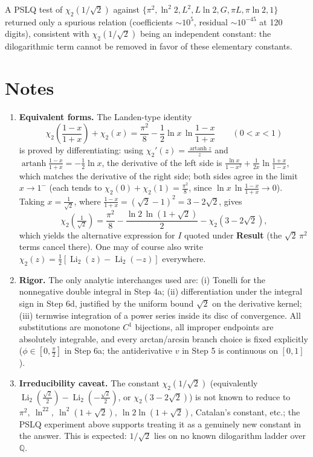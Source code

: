 \documentclass[11pt]{article}
\theoremstyle{remark}
\begin{document}
A PSLQ test of $\chi_2(1/\sqrt2)$ against $\{\pi^2,\ln^2 2,L^2,L\ln2,G,\pi L,\pi\ln2,1\}$ returned only a spurious relation (coefficients $\sim10^5$, residual $\sim10^{-45}$ at 120 digits), consistent with $\chi_2(1/\sqrt2)$ being an independent constant: the dilogarithmic term cannot be removed in favor of these elementary constants.

\section*{Notes}

\begin{enumerate}
\item \textbf{Equivalent forms.} The Landen-type identity
\[\chi_2\!\left(\frac{1-x}{1+x}\right)+\chi_2(x)=\frac{\pi^2}{8}-\frac12\ln x\,\ln\frac{1-x}{1+x}\qquad(0<x<1)\]
is proved by differentiating: using $\chi_2'(z)=\frac{\operatorname{artanh}z}{z}$ and $\operatorname{artanh}\frac{1-x}{1+x}=-\frac12\ln x$, the derivative of the left side is $\frac{\ln x}{1-x^2}+\frac{1}{2x}\ln\frac{1+x}{1-x}$, which matches the derivative of the right side; both sides agree in the limit $x\to1^-$ (each tends to $\chi_2(0)+\chi_2(1)=\frac{\pi^2}{8}$, since $\ln x\,\ln\frac{1-x}{1+x}\to0$). Taking $x=\frac1{\sqrt2}$, where $\frac{1-x}{1+x}=(\sqrt2-1)^2=3-2\sqrt2$, gives
\[\chi_2\!\left(\tfrac{1}{\sqrt2}\right)=\frac{\pi^2}{8}-\frac{\ln2\,\ln(1+\sqrt2)}{2}-\chi_2\!\left(3-2\sqrt2\right),\]
which yields the alternative expression for $I$ quoted under \textbf{Result} (the $\sqrt2\,\pi^2$ terms cancel there). One may of course also write $\chi_2(z)=\frac12[\operatorname{Li}_2(z)-\operatorname{Li}_2(-z)]$ everywhere.

\item \textbf{Rigor.} The only analytic interchanges used are: (i) Tonelli for the nonnegative double integral in Step 4a; (ii) differentiation under the integral sign in Step 6d, justified by the uniform bound $\sqrt2$ on the derivative kernel; (iii) termwise integration of a power series inside its disc of convergence. All substitutions are monotone $C^1$ bijections, all improper endpoints are absolutely integrable, and every arctan/arcsin branch choice is fixed explicitly ($\phi\in[0,\frac\pi2]$ in Step 6a; the antiderivative $v$ in Step 5 is continuous on $[0,1]$).

\item \textbf{Irreducibility caveat.} The constant $\chi_2(1/\sqrt2)$ (equivalently $\operatorname{Li}_2(\tfrac{\sqrt2}{2})-\operatorname{Li}_2(-\tfrac{\sqrt2}{2})$, or $\chi_2(3-2\sqrt2)$) is not known to reduce to $\pi^2,\ \ln^22,\ \ln^2(1+\sqrt2),\ \ln2\ln(1+\sqrt2)$, Catalan's constant, etc.; the PSLQ experiment above supports treating it as a genuinely new constant in the answer. This is expected: $1/\sqrt2$ lies on no known dilogarithm ladder over $\mathbb Q$.
\end{enumerate}
\end{document}
